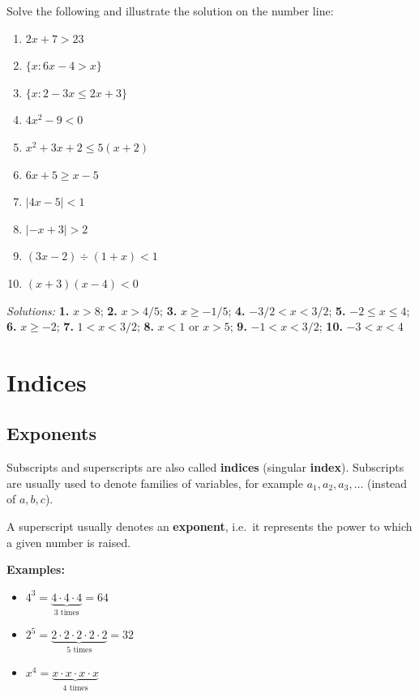 \documentclass[
  12pt,
  oneside]{book}
\providecommand{\tightlist}{%
  \setlength{\itemsep}{0pt}\setlength{\parskip}{0pt}}
\theoremstyle{definition}
\theoremstyle{definition}
\theoremstyle{definition}
\theoremstyle{definition}
\theoremstyle{remark}
\begin{document}
Solve the following and illustrate the solution on the number line:

\begin{enumerate}
\def\labelenumi{\arabic{enumi}.}
\item
  \(2x+7>23\)
\item
  \(\{x: 6x-4>x\}\)
\item
  \(\{x: 2-3x \leq 2x+3\}\)
\item
  \(4x^2-9<0\)
\item
  \(x^2+3x+2\leq 5(x+2)\)
\item
  \(6x+5\geq x-5\)
\item
  \(|4x-5|<1\)
\item
  \(|-x+3|>2\)
\item
  \((3x-2)\div(1+x)<1\)
\item
  \((x+3)(x-4)<0\)
\end{enumerate}

\emph{Solutions:}
\textbf{1.} \(x>8\);
\textbf{2.} \(x>4/5\);
\textbf{3.} \(x\geq-1/5\);
\textbf{4.} \(-3/2< x< 3/2\);
\textbf{5.} \(-2\leq x\leq4\);
\textbf{6.} \(x\geq-2\);
\textbf{7.} \(1<x<3/2\);
\textbf{8.} \(x<1\) or \(x>5\);
\textbf{9.} \(-1<x<3/2\);
\textbf{10.} \(-3<x<4\)

\chapter{Indices}\label{indices}

\section{Exponents}\label{exponents}

Subscripts and superscripts are also called \textbf{indices} (singular \textbf{index}). Subscripts are usually used to denote families of variables, for example \(a_1,a_2,a_3,\dots\) (instead of \(a,b,c\)).

A superscript usually denotes an \textbf{exponent}, i.e.~it represents the power to which a given number is raised.

\textbf{Examples:}

\begin{itemize}
\tightlist
\item
  \(4^3=\underbrace{4\cdot4\cdot4}_{3\text{ times}}=64\)
\item
  \(2^5=\underbrace{2\cdot2\cdot2\cdot2\cdot2}_{5\text{ times}}=32\)
\item
  \(x^4=\underbrace{x\cdot x\cdot x\cdot x}_{4\text{ times}}\)
\end{itemize}
\end{document}
